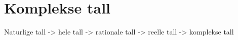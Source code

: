 \documentclass[a4paper,norsk,12pt]{article}
\begin{document}
\section{Komplekse tall}

Naturlige tall -> hele tall -> rationale tall -> reelle tall -> komplekse tall
\end{document}
